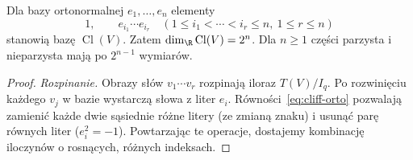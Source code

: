 \begin{twierdzenie}
\label{thm:cliff-baza}
Dla bazy ortonormalnej $e_1,\ldots,e_n$ elementy
\[
 1,\qquad e_{i_1}\cdots e_{i_r}
 \quad(1\leq i_1<\cdots<i_r\leq n,\ 1\leq r\leq n)
\]
stanowią bazę $\operatorname{Cl}(V)$. Zatem
$\dim_\R\operatorname{Cl}(V)=2^n$.
Dla $n\geq1$ części parzysta i nieparzysta mają
po $2^{n-1}$ wymiarów.
\end{twierdzenie}
\begin{proof}
\emph{Rozpinanie.} Obrazy słów $v_1\cdots v_r$
rozpinają iloraz $T(V)/I_q$. Po rozwinięciu każdego
$v_j$ w bazie wystarczą słowa z liter $e_i$.
Równości~\eqref{eq:cliff-orto} pozwalają zamienić
każde dwie sąsiednie różne litery (ze zmianą znaku)
i usunąć parę równych liter ($e_i^2=-1$).
Powtarzając te operacje, dostajemy kombinację
iloczynów o rosnących, różnych indeksach.


\end{proof}
